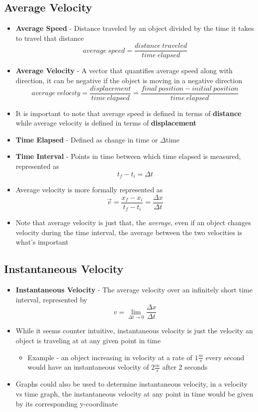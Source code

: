 \subsection{Average Velocity}
\begin{itemize}
    \item \textbf{Average Speed} - Distance traveled by an object divided by the time it takes to travel that distance \[average\ speed=\frac{distance\ traveled}{time\ elapsed}\]
    \item \textbf{Average Velocity} - A vector that quantifies average speed along with direction, it can be negative if the object is moving in a negative direction\[average\ velocity=\frac{displacement}{time\ elapsed}=\frac{final\ position-initial\ position}{time\ elapsed}\]
    \item It is important to note that average speed is defined in terms of \textbf{distance} while average velocity is defined in terms of \textbf{displacement}
    \item \textbf{Time Elapsed} - Defined as change in time or $\Delta$time
    \item \textbf{Time Interval} - Points in time between which time elapsed is measured, represented as \[t_f-t_i=\Delta t\]
    \item Average velocity is more formally represented as \[\vec{v}=\frac{x_f-x_i}{t_f-t_i}=\frac{\Delta x}{\Delta t}\]
    \item Note that average velocity is just that, the \emph{average}, even if an object changes velocity during the time interval, the average between the two velocities is what's important
\end{itemize}

\subsection{Instantaneous Velocity}
\begin{itemize}
    \item \textbf{Instantaneous Velocity} - The average velocity over an infinitely short time interval, represented by \[v=\lim_{\Delta t\to 0}\frac{\Delta x}{\Delta t}\]
    \item While it seems counter intuitive, instantaneous velocity is just the velocity an object is traveling at at any given point in time
    \begin{itemize}
        \item Example - an object increasing in velocity at a rate of $1\frac{m}{s}$ every second would have an instantaneous velocity of $2\frac{m}{s}$ after 2 seconds
    \end{itemize}
    \item Graphs could also be used to determine instantaneous velocity, in a velocity vs time graph, the instantaneous velocity at any point in time would be given by its corresponding y-coordinate
\end{itemize}

